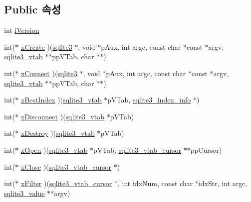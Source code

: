 \subsection*{Public 속성}
\begin{DoxyCompactItemize}
\item 
int \hyperlink{structsqlite3__module_a42b11d080dc205aea43581b18f925afe}{i\+Version}
\item 
int($\ast$ \hyperlink{structsqlite3__module_a5934e38da1222cac999d01d372af293e}{x\+Create} )(\hyperlink{sqlite3_8h_a0ef6f2646262c8a9b24368d8ac140f69}{sqlite3} $\ast$, void $\ast$p\+Aux, int argc, const char $\ast$const $\ast$argv, \hyperlink{structsqlite3__vtab}{sqlite3\+\_\+vtab} $\ast$$\ast$pp\+V\+Tab, char $\ast$$\ast$)
\item 
int($\ast$ \hyperlink{structsqlite3__module_a457fe622b5334195640e3e835c9923a8}{x\+Connect} )(\hyperlink{sqlite3_8h_a0ef6f2646262c8a9b24368d8ac140f69}{sqlite3} $\ast$, void $\ast$p\+Aux, int argc, const char $\ast$const $\ast$argv, \hyperlink{structsqlite3__vtab}{sqlite3\+\_\+vtab} $\ast$$\ast$pp\+V\+Tab, char $\ast$$\ast$)
\item 
int($\ast$ \hyperlink{structsqlite3__module_aad92b2cd56253baaeac656d7693ce4af}{x\+Best\+Index} )(\hyperlink{structsqlite3__vtab}{sqlite3\+\_\+vtab} $\ast$p\+V\+Tab, \hyperlink{structsqlite3__index__info}{sqlite3\+\_\+index\+\_\+info} $\ast$)
\item 
int($\ast$ \hyperlink{structsqlite3__module_a0107afd3c350db14098edbaae04342df}{x\+Disconnect} )(\hyperlink{structsqlite3__vtab}{sqlite3\+\_\+vtab} $\ast$p\+V\+Tab)
\item 
int($\ast$ \hyperlink{structsqlite3__module_a0ec3414a65bb24f400e8cfd820751412}{x\+Destroy} )(\hyperlink{structsqlite3__vtab}{sqlite3\+\_\+vtab} $\ast$p\+V\+Tab)
\item 
int($\ast$ \hyperlink{structsqlite3__module_a3f1e18ef5e5bd4ddbd9500c7cd951f34}{x\+Open} )(\hyperlink{structsqlite3__vtab}{sqlite3\+\_\+vtab} $\ast$p\+V\+Tab, \hyperlink{structsqlite3__vtab__cursor}{sqlite3\+\_\+vtab\+\_\+cursor} $\ast$$\ast$pp\+Cursor)
\item 
int($\ast$ \hyperlink{structsqlite3__module_acc6c4d6d41f3d056e297eea9725b887c}{x\+Close} )(\hyperlink{structsqlite3__vtab__cursor}{sqlite3\+\_\+vtab\+\_\+cursor} $\ast$)
\item 
int($\ast$ \hyperlink{structsqlite3__module_a46ba11ba4d07f7fdcab4f35bf2045300}{x\+Filter} )(\hyperlink{structsqlite3__vtab__cursor}{sqlite3\+\_\+vtab\+\_\+cursor} $\ast$, int idx\+Num, const char $\ast$idx\+Str, int argc, \hyperlink{sqlite3_8h_ac2fa1ecdb2290d9af6010edbd1cbc83c}{sqlite3\+\_\+value} $\ast$$\ast$argv)

\end{DoxyCompactItemize}
